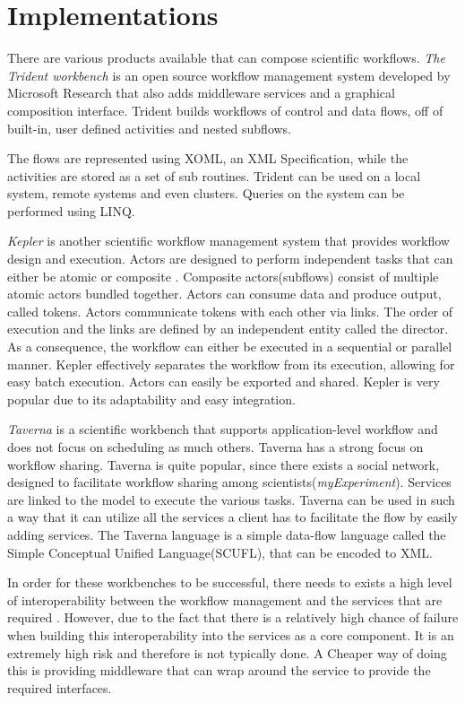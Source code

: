 \documentclass[12pt,a4paper]{report}
\begin{document}
\section{Implementations}
There are various products available that can compose scientific workflows.
\emph{The Trident workbench} \cite{Simmhan:2009:BTS:1673063.1673121} is an open
source workflow management system developed by Microsoft Research that also
adds middleware services and a graphical composition interface. Trident builds
workflows of control and data flows, off of built-in, user defined activities
and nested subflows.

The flows are represented using XOML, an XML Specification, while the
activities are stored as a set of sub routines\cite{Simmhan2011790}. Trident
can be used on a local system, remote systems and even clusters.  Queries on
the system can be performed using LINQ.


\emph{Kepler} is another scientific workflow management system that
provides workflow design and execution.  Actors are designed to perform
independent tasks that can either be atomic or  composite
\cite{Wang:2009:KHG:1645164.1645176}.  Composite actors(subflows) consist of
multiple   atomic actors bundled together. Actors can consume data and produce
output, called tokens. Actors communicate tokens with each other via links. The
order of execution and the links are defined by an independent entity called
the director. As a consequence, the workflow can either be executed in a
sequential or parallel manner. Kepler effectively separates the workflow from
its execution, allowing for easy batch execution. Actors can easily be exported
and shared.  Kepler is very popular due to its adaptability and easy
integration.

    \emph{Taverna} is a scientific workbench that supports application-level
workflow and does not focus on scheduling as much others\cite{4721191}. Taverna
has a strong focus on workflow sharing. Taverna is quite popular, since there
exists a social network, designed to facilitate workflow sharing among
scientists(\emph{myExperiment}). Services are linked to the model to execute
the various tasks. Taverna can be used in such a way that it can utilize all
the services a client has to facilitate the flow by easily adding services. The
Taverna language is a simple data-flow language called the Simple Conceptual
Unified Language(SCUFL), that can be encoded to XML.

In order for these workbenches to be successful, there needs to exists a
high level of interoperability between the workflow management and the services
that are required \cite{Shegalov:2001:XWM:767132.767139}.  However, due to the
fact that there is a relatively high chance of failure when building this
interoperability into the services as a core component. It is an extremely high
risk and therefore is not typically done. A Cheaper way of doing this is
providing middleware that can wrap around the service to provide the required
interfaces.
\end{document}
